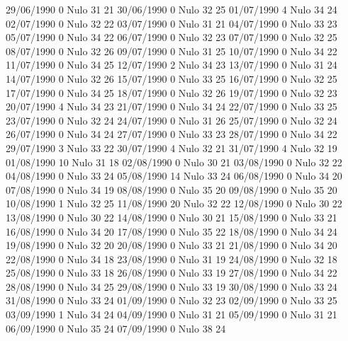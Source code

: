 29/06/1990  0     Nulo    31     21 
30/06/1990  0     Nulo    32     25 
01/07/1990  4     Nulo    34     24 
02/07/1990  0     Nulo    32     22 
03/07/1990  0     Nulo    31     21 
04/07/1990  0     Nulo    33     23 
05/07/1990  0     Nulo    34     22 
06/07/1990  0     Nulo    32     23 
07/07/1990  0     Nulo    32     25 
08/07/1990  0     Nulo    32     26 
09/07/1990  0     Nulo    31     25 
10/07/1990  0     Nulo    34     22 
11/07/1990  0     Nulo    34     25 
12/07/1990  2     Nulo    34     23 
13/07/1990  0     Nulo    31     24 
14/07/1990  0     Nulo    32     26 
15/07/1990  0     Nulo    33     25 
16/07/1990  0     Nulo    32     25 
17/07/1990  0     Nulo    34     25 
18/07/1990  0     Nulo    32     26 
19/07/1990  0     Nulo    32     23 
20/07/1990  4     Nulo    34     23 
21/07/1990  0     Nulo    34     24 
22/07/1990  0     Nulo    33     25 
23/07/1990  0     Nulo    32     24 
24/07/1990  0     Nulo    31     26 
25/07/1990  0     Nulo    32     24 
26/07/1990  0     Nulo    34     24 
27/07/1990  0     Nulo    33     23 
28/07/1990  0     Nulo    34     22 
29/07/1990  3     Nulo    33     22 
30/07/1990  4     Nulo    32     21 
31/07/1990  4     Nulo    32     19 
01/08/1990  10    Nulo    31     18 
02/08/1990  0     Nulo    30     21 
03/08/1990  0     Nulo    32     22 
04/08/1990  0     Nulo    33     24 
05/08/1990  14    Nulo    33     24 
06/08/1990  0     Nulo    34     20 
07/08/1990  0     Nulo    34     19 
08/08/1990  0     Nulo    35     20 
09/08/1990  0     Nulo    35     20 
10/08/1990  1     Nulo    32     25 
11/08/1990  20    Nulo    32     22 
12/08/1990  0     Nulo    30     22 
13/08/1990  0     Nulo    30     22 
14/08/1990  0     Nulo    30     21 
15/08/1990  0     Nulo    33     21 
16/08/1990  0     Nulo    34     20 
17/08/1990  0     Nulo    35     22 
18/08/1990  0     Nulo    34     24 
19/08/1990  0     Nulo    32     20 
20/08/1990  0     Nulo    33     21 
21/08/1990  0     Nulo    34     20 
22/08/1990  0     Nulo    34     18 
23/08/1990  0     Nulo    31     19 
24/08/1990  0     Nulo    32     18 
25/08/1990  0     Nulo    33     18 
26/08/1990  0     Nulo    33     19 
27/08/1990  0     Nulo    34     22 
28/08/1990  0     Nulo    34     25 
29/08/1990  0     Nulo    33     19 
30/08/1990  0     Nulo    33     24 
31/08/1990  0     Nulo    33     24 
01/09/1990  0     Nulo    32     23 
02/09/1990  0     Nulo    33     25 
03/09/1990  1     Nulo    34     24 
04/09/1990  0     Nulo    31     21 
05/09/1990  0     Nulo    31     21 
06/09/1990  0     Nulo    35     24 
07/09/1990  0     Nulo    38     24 
